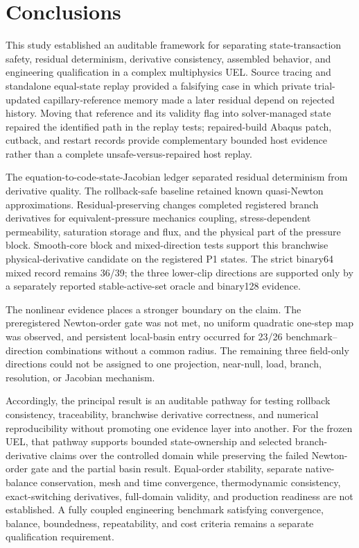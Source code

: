 \documentclass[preprint,12pt,authoryear]{elsarticle}
\begin{document}
\section{Conclusions}

This study established an auditable framework for separating state-transaction safety, residual determinism, derivative consistency, assembled behavior, and engineering qualification in a complex multiphysics UEL. Source tracing and standalone equal-state replay provided a falsifying case in which private trial-updated capillary-reference memory made a later residual depend on rejected history. Moving that reference and its validity flag into solver-managed state repaired the identified path in the replay tests; repaired-build Abaqus patch, cutback, and restart records provide complementary bounded host evidence rather than a complete unsafe-versus-repaired host replay.

The equation-to-code-state-Jacobian ledger separated residual determinism from derivative quality. The rollback-safe baseline retained known quasi-Newton approximations. Residual-preserving changes completed registered branch derivatives for equivalent-pressure mechanics coupling, stress-dependent permeability, saturation storage and flux, and the physical part of the pressure block. Smooth-core block and mixed-direction tests support this branchwise physical-derivative candidate on the registered P1 states. The strict binary64 mixed record remains 36/39; the three lower-clip directions are supported only by a separately reported stable-active-set oracle and binary128 evidence.

The nonlinear evidence places a stronger boundary on the claim. The preregistered Newton-order gate was not met, no uniform quadratic one-step map was observed, and persistent local-basin entry occurred for 23/26 benchmark--direction combinations without a common radius. The remaining three field-only directions could not be assigned to one projection, near-null, load, branch, resolution, or Jacobian mechanism.

Accordingly, the principal result is an auditable pathway for testing rollback consistency, traceability, branchwise derivative correctness, and numerical reproducibility without promoting one evidence layer into another. For the frozen UEL, that pathway supports bounded state-ownership and selected branch-derivative claims over the controlled domain while preserving the failed Newton-order gate and the partial basin result. Equal-order stability, separate native-balance conservation, mesh and time convergence, thermodynamic consistency, exact-switching derivatives, full-domain validity, and production readiness are not established. A fully coupled engineering benchmark satisfying convergence, balance, boundedness, repeatability, and cost criteria remains a separate qualification requirement.
\end{document}
